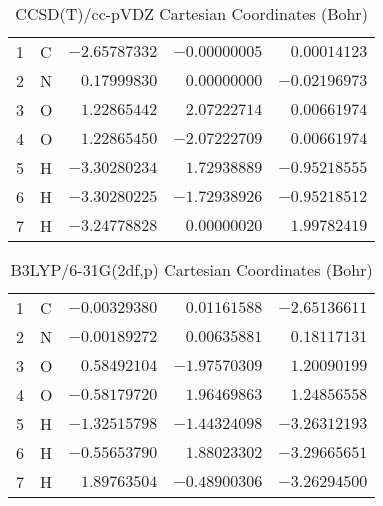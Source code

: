 \documentclass[10pt,oneside]{article}
\begin{document}
\begin{table}[h!]
\centering
\caption{CCSD(T)/cc-pVDZ Cartesian Coordinates (Bohr)}
\begin{tabular}{llrrr}
1  & C  & $-2.65787332$ & $-0.00000005$ & $ 0.00014123$ \\
2  & N  & $ 0.17999830$ & $ 0.00000000$ & $-0.02196973$ \\
3  & O  & $ 1.22865442$ & $ 2.07222714$ & $ 0.00661974$ \\
4  & O  & $ 1.22865450$ & $-2.07222709$ & $ 0.00661974$ \\
5  & H  & $-3.30280234$ & $ 1.72938889$ & $-0.95218555$ \\
6  & H  & $-3.30280225$ & $-1.72938926$ & $-0.95218512$ \\
7  & H  & $-3.24778828$ & $ 0.00000020$ & $ 1.99782419$ \\
\end{tabular}
\end{table}

\begin{table}[h!]
\centering
\caption{B3LYP/6-31G(2df,p) Cartesian Coordinates (Bohr)}
\begin{tabular}{llrrr}
1  & C  & $-0.00329380$ & $ 0.01161588$ & $-2.65136611$ \\
2  & N  & $-0.00189272$ & $ 0.00635881$ & $ 0.18117131$ \\
3  & O  & $ 0.58492104$ & $-1.97570309$ & $ 1.20090199$ \\
4  & O  & $-0.58179720$ & $ 1.96469863$ & $ 1.24856558$ \\
5  & H  & $-1.32515798$ & $-1.44324098$ & $-3.26312193$ \\
6  & H  & $-0.55653790$ & $ 1.88023302$ & $-3.29665651$ \\
7  & H  & $ 1.89763504$ & $-0.48900306$ & $-3.26294500$ \\
\end{tabular}
\end{table}

\clearpage
\end{document}
